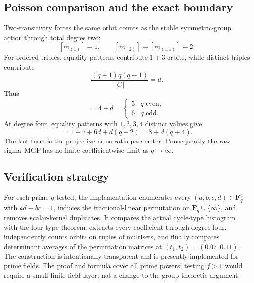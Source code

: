 \documentclass[10pt]{article}
\begin{document}
\subsection{Poisson comparison and the exact boundary}
Two-transitivity forces the same orbit counts as the stable symmetric-group action through total degree two:
\[
 [m_{(1)}]=1,\qquad [m_{(2)}]=[m_{(1,1)}]=2.
\]
For ordered triples, equality patterns contribute $1+3$ orbits, while distinct triples contribute
\[
 \frac{(q+1)q(q-1)}{|G|}=d.
\]
Thus
\begin{equation}[m_{(1,1,1)}]=4+d=\begin{cases}5&q\text{ even},\\6&q\text{ odd}.\end{cases} \tag{3}\end{equation}
At degree four, equality patterns with $1,2,3,4$ distinct values give
\begin{equation}[m_{(1,1,1,1)}]=1+7+6d+d(q-2)=8+d(q+4). \tag{4}\end{equation}
The last term is the projective cross-ratio parameter.  Consequently the raw sigma--MGF has no finite coefficientwise limit as $q\to\infty$.

\subsection{Verification strategy}
For each prime $q$ tested, the implementation enumerates every
$(a,b,c,d)\in\mathbf F_q^4$ with $ad-bc=1$, induces the fractional-linear
permutation on $\mathbf F_q\cup\{\infty\}$, and removes scalar-kernel
duplicates.  It compares the actual cycle-type histogram with the four-type
theorem, extracts every coefficient through degree four, independently counts
orbits on tuples of multisets, and finally compares determinant averages of
the permutation matrices at $(t_1,t_2)=(0.07,0.11)$.
The construction is intentionally transparent and is presently implemented for prime fields.  The proof and formula cover all prime powers; testing $f>1$ would require a small finite-field layer, not a change to the group-theoretic argument.
\endgroup


\clearpage
\end{document}
